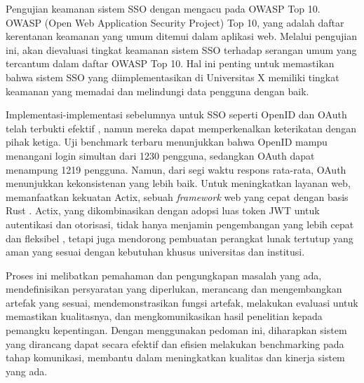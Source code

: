 \documentclass{article}
\begin{document}
Pengujian keamanan sistem SSO dengan mengacu pada OWASP Top 10. OWASP (Open Web Application Security Project) Top 10, yang adalah daftar kerentanan keamanan yang umum ditemui dalam aplikasi web. Melalui pengujian ini, akan dievaluasi tingkat keamanan sistem SSO terhadap serangan umum yang tercantum dalam daftar OWASP Top 10\autocite{Priyawati2022WebsiteVT}. Hal ini penting untuk memastikan bahwa sistem SSO yang diimplementasikan di Universitas X memiliki tingkat keamanan yang memadai dan melindungi data pengguna dengan baik.

Implementasi-implementasi sebelumnya untuk SSO seperti OpenID dan OAuth telah terbukti efektif \autocite{ComparativeAnaWaluyo2022}, namun mereka dapat memperkenalkan keterikatan dengan pihak ketiga. Uji benchmark terbaru menunjukkan bahwa OpenID mampu menangani login simultan dari 1230 pengguna, sedangkan OAuth dapat menampung 1219 pengguna\autocite{ComparativeAnaWaluyo2022}. Namun, dari segi waktu respons rata-rata, OAuth menunjukkan kekonsistenan yang lebih baik. Untuk meningkatkan layanan web, memanfaatkan kekuatan Actix, sebuah \emph{framework} web yang cepat dengan basis Rust\autocite{kyriakou2022complementing} . Actix, yang dikombinasikan dengan adopsi luas token JWT untuk autentikasi dan otorisasi, tidak hanya menjamin pengembangan yang lebih cepat dan fleksibel \autocite{ADynamicFederAlsade2022}, tetapi juga mendorong pembuatan perangkat lunak tertutup yang aman yang sesuai dengan kebutuhan khusus universitas dan institusi.

Proses ini melibatkan pemahaman dan pengungkapan masalah yang ada, mendefinisikan persyaratan yang diperlukan, merancang dan mengembangkan artefak yang sesuai, mendemonstrasikan fungsi artefak, melakukan evaluasi untuk memastikan kualitasnya, dan mengkomunikasikan hasil penelitian kepada pemangku kepentingan. Dengan menggunakan pedoman ini, diharapkan sistem yang dirancang dapat secara efektif dan efisien melakukan benchmarking pada tahap komunikasi, membantu dalam meningkatkan kualitas dan kinerja sistem yang ada\autocite{DesignScienceHevner2004}.

% 
% 
\printbibliography[title=Daftar Pustaka]
\newpage
\end{document}

